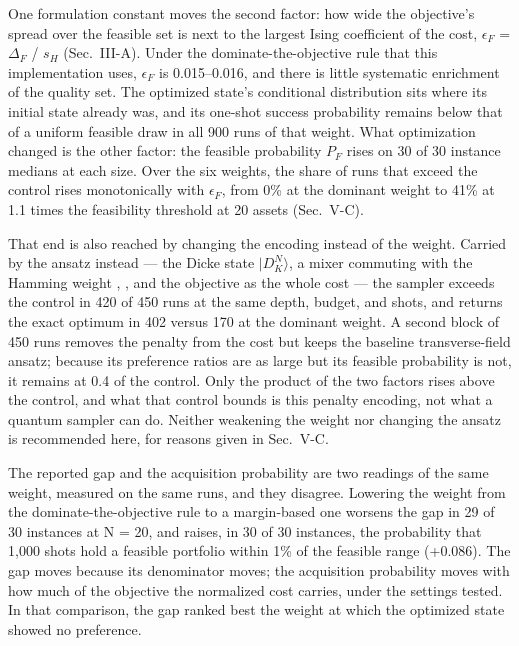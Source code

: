 \documentclass[journal]{IEEEtran}
\begin{document}
One formulation constant moves the second factor: how wide the objective's spread over the feasible set is next to the largest Ising coefficient of the cost, $\epsilon_{F}$ = $\Delta_{F}$ / $s_{H}$ (Sec.~III-A). Under the dominate-the-objective rule that this implementation uses, $\epsilon_{F}$ is 0.015--0.016, and there is little systematic enrichment of the quality set. The optimized state's conditional distribution sits where its initial state already was, and its one-shot success probability remains below that of a uniform feasible draw in all 900 runs of that weight. What optimization changed is the other factor: the feasible probability $P_{F}$ rises on 30 of 30 instance medians at each size. Over the six weights, the share of runs that exceed the control rises monotonically with $\epsilon_{F}$, from 0\% at the dominant weight to 41\% at 1.1 times the feasibility threshold at 20 assets (Sec.~V-C).


That end is also reached by changing the encoding instead of the weight. Carried by the ansatz instead --- the Dicke state $|$$D^{N}_{K}$$\rangle$, a mixer commuting with the Hamming weight \cite{ref11}, \cite{ref12}, and the objective as the whole cost --- the sampler exceeds the control in 420 of 450 runs at the same depth, budget, and shots, and returns the exact optimum in 402 versus 170 at the dominant weight. A second block of 450 runs removes the penalty from the cost but keeps the baseline transverse-field ansatz; because its preference ratios are as large but its feasible probability is not, it remains at 0.4 of the control. Only the product of the two factors rises above the control, and what that control bounds is this penalty encoding, not what a quantum sampler can do. Neither weakening the weight nor changing the ansatz is recommended here, for reasons given in Sec.~V-C.


The reported gap and the acquisition probability are two readings of the same weight, measured on the same runs, and they disagree. Lowering the weight from the dominate-the-objective rule to a margin-based one worsens the gap in 29 of 30 instances at N = 20, and raises, in 30 of 30 instances, the probability that 1,000 shots hold a feasible portfolio within 1\% of the feasible range (+0.086). The gap moves because its denominator moves; the acquisition probability moves with how much of the objective the normalized cost carries, under the settings tested. In that comparison, the gap ranked best the weight at which the optimized state showed no preference.
\end{document}
